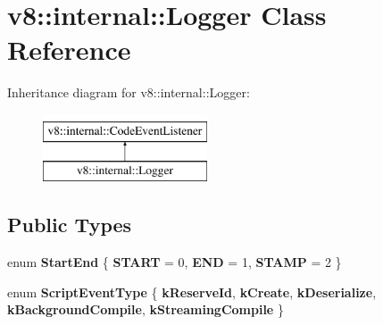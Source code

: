 \hypertarget{classv8_1_1internal_1_1Logger}{}\section{v8\+:\+:internal\+:\+:Logger Class Reference}
\label{classv8_1_1internal_1_1Logger}
Inheritance diagram for v8\+:\+:internal\+:\+:Logger\+:\begin{figure}[H]
\begin{center}
\leavevmode
\includegraphics[height=2.000000cm]{classv8_1_1internal_1_1Logger}
\end{center}
\end{figure}
\subsection*{Public Types}
\begin{DoxyCompactItemize}
\item 
\mbox{\label{classv8_1_1internal_1_1Logger_ae1d0584967c39c5e1a33a9d8a16ce1e7}} 
enum {\bfseries Start\+End} \{ {\bfseries S\+T\+A\+RT} = 0, 
{\bfseries E\+ND} = 1, 
{\bfseries S\+T\+A\+MP} = 2
 \}
\item 
\mbox{\label{classv8_1_1internal_1_1Logger_ab8051ff8092f40d88b86fed63f95cd7a}} 
enum {\bfseries Script\+Event\+Type} \{ \newline
{\bfseries k\+Reserve\+Id}, 
{\bfseries k\+Create}, 
{\bfseries k\+Deserialize}, 
{\bfseries k\+Background\+Compile}, 
\newline
{\bfseries k\+Streaming\+Compile}
 \}
\end{DoxyCompactItemize}
